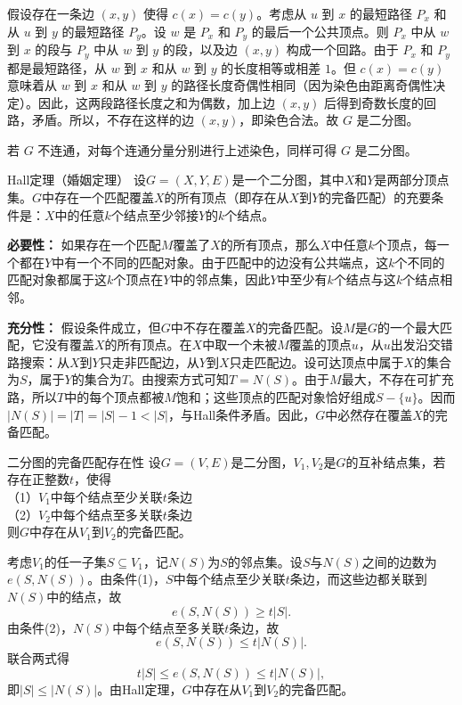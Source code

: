 \documentclass[lang=cn,11pt]{elegantbook}
\begin{document}
    假设存在一条边 $(x,y)$ 使得 $c(x)=c(y)$。考虑从 $u$ 到 $x$ 的最短路径 $P_x$ 和从 $u$ 到 $y$ 的最短路径 $P_y$。设 $w$ 是 $P_x$ 和 $P_y$ 的最后一个公共顶点。则 $P_x$ 中从 $w$ 到 $x$ 的段与 $P_y$ 中从 $w$ 到 $y$ 的段，以及边 $(x,y)$ 构成一个回路。由于 $P_x$ 和 $P_y$ 都是最短路径，从 $w$ 到 $x$ 和从 $w$ 到 $y$ 的长度相等或相差 $1$。但 $c(x)=c(y)$ 意味着从 $w$ 到 $x$ 和从 $w$ 到 $y$ 的路径长度奇偶性相同（因为染色由距离奇偶性决定）。因此，这两段路径长度之和为偶数，加上边 $(x,y)$ 后得到奇数长度的回路，矛盾。所以，不存在这样的边 $(x,y)$，即染色合法。故 $G$ 是二分图。

    若 $G$ 不连通，对每个连通分量分别进行上述染色，同样可得 $G$ 是二分图。

\begin{theorem}{Hall定理（婚姻定理）}
    设$G=(X,Y,E)$是一个二分图，其中$X$和$Y$是两部分顶点集。$G$中存在一个匹配覆盖$X$的所有顶点（即存在从$X$到$Y$的完备匹配）的充要条件是：$X$中的任意$k$个结点至少邻接$Y$的$k$个结点。
\end{theorem}
\textbf{必要性：} 如果存在一个匹配$M$覆盖了$X$的所有顶点，那么$X$中任意$k$个顶点，每一个都在$Y$中有一个不同的匹配对象。由于匹配中的边没有公共端点，这$k$个不同的匹配对象都属于这$k$个顶点在$Y$中的邻点集，因此$Y$中至少有$k$个结点与这$k$个结点相邻。

\textbf{充分性：} 假设条件成立，但$G$中不存在覆盖$X$的完备匹配。设$M$是$G$的一个最大匹配，它没有覆盖$X$的所有顶点。在$X$中取一个未被$M$覆盖的顶点$u$，从$u$出发沿交错路搜索：从$X$到$Y$只走非匹配边，从$Y$到$X$只走匹配边。设可达顶点中属于$X$的集合为$S$，属于$Y$的集合为$T$。由搜索方式可知$T=N(S)$。由于$M$最大，不存在可扩充路，所以$T$中的每个顶点都被$M$饱和；这些顶点的匹配对象恰好组成$S-\{u\}$。因而$|N(S)|=|T|=|S|-1<|S|$，与Hall条件矛盾。因此，$G$中必然存在覆盖$X$的完备匹配。
\begin{theorem}{二分图的完备匹配存在性}
    设$G=(V,E)$是二分图，$V_1,V_2$是$G$的互补结点集，若存在正整数$t$，使得\\
    （1）$V_1$中每个结点至少关联$t$条边\\
    （2）$V_2$中每个结点至多关联$t$条边\\
    则$G$中存在从$V_1$到$V_2$的完备匹配。
\end{theorem}
考虑$V_1$的任一子集$S\subseteq V_1$，记$N(S)$为$S$的邻点集。设$S$与$N(S)$之间的边数为$e(S,N(S))$。由条件(1)，$S$中每个结点至少关联$t$条边，而这些边都关联到$N(S)$中的结点，故
    \[
    e(S,N(S)) \ge t|S|.
    \]
    由条件(2)，$N(S)$中每个结点至多关联$t$条边，故
    \[
    e(S,N(S)) \le t|N(S)|.
    \]
    联合两式得
    \[
    t|S| \le e(S,N(S)) \le t|N(S)|,
    \]
    即$|S|\le |N(S)|$。由Hall定理，$G$中存在从$V_1$到$V_2$的完备匹配。
\end{document}
